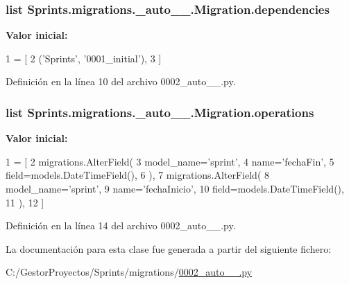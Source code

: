 \subsubsection[{\texorpdfstring{dependencies}{dependencies}}]{\setlength{\rightskip}{0pt plus 5cm}list Sprints.\+migrations.\+\_\+auto\+\_\+\_.\+Migration.\+dependencies\hspace{0.3cm}{\ttfamily [static]}}\hypertarget{class_sprints_1_1migrations_1_10002__auto__20160610__1357_1_1_migration_a9b8f97eef16f1e8b633c70273c678e56}{}\label{class_sprints_1_1migrations_1_10002__auto__20160610__1357_1_1_migration_a9b8f97eef16f1e8b633c70273c678e56}
{\bfseries Valor inicial\+:}
\begin{DoxyCode}
1 = [
2         (\textcolor{stringliteral}{'Sprints'}, \textcolor{stringliteral}{'0001\_initial'}),
3     ]
\end{DoxyCode}


Definición en la línea 10 del archivo 0002\+\_\+auto\+\_\+\_.\+py.

\subsubsection[{\texorpdfstring{operations}{operations}}]{\setlength{\rightskip}{0pt plus 5cm}list Sprints.\+migrations.\+\_\+auto\+\_\+\_.\+Migration.\+operations\hspace{0.3cm}{\ttfamily [static]}}\hypertarget{class_sprints_1_1migrations_1_10002__auto__20160610__1357_1_1_migration_ae715f7d9f05cfc4c4931620d38ca7e8f}{}\label{class_sprints_1_1migrations_1_10002__auto__20160610__1357_1_1_migration_ae715f7d9f05cfc4c4931620d38ca7e8f}
{\bfseries Valor inicial\+:}
\begin{DoxyCode}
1 = [
2         migrations.AlterField(
3             model\_name=\textcolor{stringliteral}{'sprint'},
4             name=\textcolor{stringliteral}{'fechaFin'},
5             field=models.DateTimeField(),
6         ),
7         migrations.AlterField(
8             model\_name=\textcolor{stringliteral}{'sprint'},
9             name=\textcolor{stringliteral}{'fechaInicio'},
10             field=models.DateTimeField(),
11         ),
12     ]
\end{DoxyCode}


Definición en la línea 14 del archivo 0002\+\_\+auto\+\_\+\_.\+py.



La documentación para esta clase fue generada a partir del siguiente fichero\+:\begin{DoxyCompactItemize}
\item 
C\+:/\+Gestor\+Proyectos/\+Sprints/migrations/\hyperlink{_sprints_2migrations_20002__auto__20160610__1357_8py}{0002\+\_\+auto\+\_\+\_.\+py}\end{DoxyCompactItemize}
